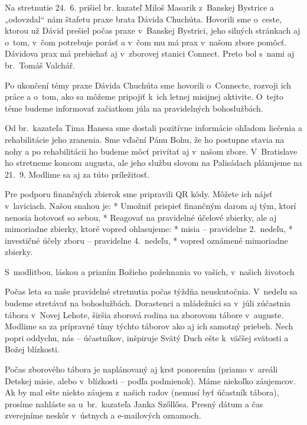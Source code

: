 Na stretnutie 24.~6. prišiel br. kazateľ Miloš Masarik z~Banskej Bystrice a „odovzdal“ nám štafetu praxe brata Dávida Chuchúta. Hovorili sme o~ceste, ktorou už Dávid prešiel počas praxe v~Banskej Bystrici, jeho silných stránkach aj o~tom, v~čom potrebuje porásť a v~čom mu má prax v~našom zbore pomôcť. Dávidova prax má prebiehať aj v~zborovej stanici Connect. Preto bol s~nami aj br.~Tomáš Valchář.

Po ukončení témy praxe Dávida Chuchúta sme hovorili o~Connecte, rozvoji ich práce a o~tom, ako sa môžeme pripojiť k~ich letnej misijnej aktivite. O~tejto téme budeme informovať začiatkom júla na pravidelných bohoslužbách.

Od br.~kazateľa Tima Hanesa sme dostali pozitívne informácie ohľadom liečenia a rehabilitácie jeho zranenia. Sme vďační Pánu Bohu, že ho postupne stavia na nohy a po rehabilitácii ho budeme môcť privítať aj v~našom zbore. V~Bratislave ho stretneme koncom augusta, ale jeho službu slovom na Palisádach plánujeme na 21.~9. Modlime sa aj za túto príležitosť.

Pre podporu finančných zbierok sme pripravili QR kódy.
Môžete ich nájsť v~laviciach. Našou snahou je:
\begitems
* Umožniť prispieť finančným darom aj tým, ktorí nenosia hotovosť so sebou,
* Reagovať na pravidelné účelové zbierky, ale aj mimoriadne zbierky, ktoré vopred ohlasujeme:
\begitems
* misia -- pravidelne 2.~nedeľu,
* investičné účely zboru -- pravidelne 4.~nedeľu,
* vopred oznámené mimoriadne zbierky.
\enditems
\enditems

S~modlitbou, láskou a prianím Božieho požehnania vo vašich, v~našich životoch



Počas leta sa naše pravidelné stretnutia počas týždňa neuskutočnia. V~nedeľu sa budeme stretávať na bohoslužbách. Dorastenci a mládežníci sa v~júli zúčastnia tábora v~Novej Lehote, širšia zborová rodina na zborovom tábore v~auguste. Modlime sa za prípravné tímy týchto táborov ako aj ich samotný priebeh. Nech  popri oddychu, nás -- účastníkov, inšpiruje Svätý Duch ešte k~väčšej svätosti a Božej blízkosti.


Počas zborového tábora je naplánovaný aj krst ponorením (priamo v~areáli Detskej misie, alebo v~blízkosti -- podľa podmienok).
Máme niekoľko záujemcov. Ak by mal ešte niekto záujem z~našich radov (nemusí byť účastník tábora), prosíme nahláste sa u~br.~kazateľa Janka Szőllősa. Presný dátum a čas zverejníme neskôr v~ústnych a e-mailových oznamoch.


